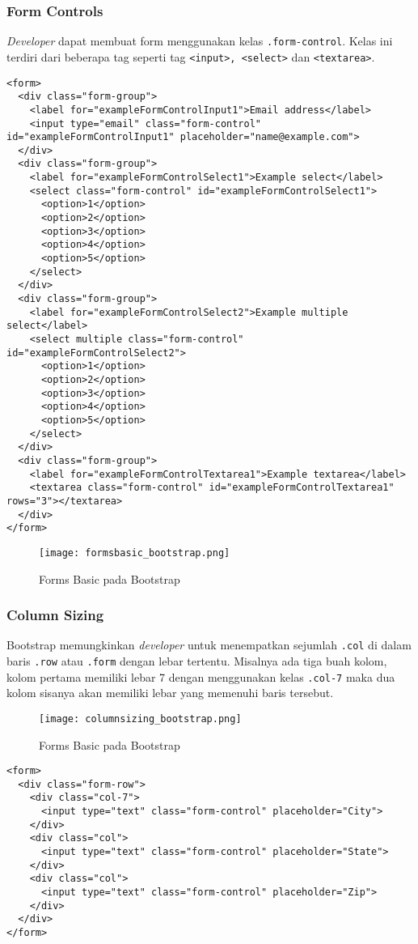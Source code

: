{\subsubsection{Form Controls}
\textit{Developer} dapat membuat form menggunakan kelas \texttt{.form-control}. Kelas ini terdiri dari beberapa tag seperti tag \texttt{<input>, <select>} dan \texttt{<textarea>}.
\begin{lstlisting}[frame=single, basicstyle=\tiny] 
<form>
  <div class="form-group">
    <label for="exampleFormControlInput1">Email address</label>
    <input type="email" class="form-control" id="exampleFormControlInput1" placeholder="name@example.com">
  </div>
  <div class="form-group">
    <label for="exampleFormControlSelect1">Example select</label>
    <select class="form-control" id="exampleFormControlSelect1">
      <option>1</option>
      <option>2</option>
      <option>3</option>
      <option>4</option>
      <option>5</option>
    </select>
  </div>
  <div class="form-group">
    <label for="exampleFormControlSelect2">Example multiple select</label>
    <select multiple class="form-control" id="exampleFormControlSelect2">
      <option>1</option>
      <option>2</option>
      <option>3</option>
      <option>4</option>
      <option>5</option>
    </select>
  </div>
  <div class="form-group">
    <label for="exampleFormControlTextarea1">Example textarea</label>
    <textarea class="form-control" id="exampleFormControlTextarea1" rows="3"></textarea>
  </div>
</form>
\end{lstlisting}

\begin{figure} [H]
	\centering  
	\texttt{[image: formsbasic\_bootstrap.png]}  
	\caption{Forms Basic pada Bootstrap} 
\end{figure} 
\subsubsection{Column Sizing}
Bootstrap memungkinkan \textit{developer} untuk menempatkan sejumlah \texttt{.col} di dalam baris \texttt{.row} atau \texttt{.form} dengan lebar tertentu. Misalnya ada tiga buah kolom, kolom pertama memiliki lebar 7 dengan menggunakan kelas \texttt{.col-7} maka dua kolom sisanya akan memiliki lebar yang  memenuhi baris tersebut.
\begin{figure} [H]
	\centering  
	\texttt{[image: columnsizing\_bootstrap.png]}  
	\caption{Forms Basic pada Bootstrap} 
\end{figure} 
\begin{lstlisting}[frame=single] 
<form>
  <div class="form-row">
    <div class="col-7">
      <input type="text" class="form-control" placeholder="City">
    </div>
    <div class="col">
      <input type="text" class="form-control" placeholder="State">
    </div>
    <div class="col">
      <input type="text" class="form-control" placeholder="Zip">
    </div>
  </div>
</form>
\end{lstlisting}
}
